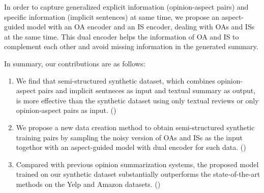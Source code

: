 In order to capture generalized explicit information (opinion-aspect pairs) and specific information  (implicit sentences) at same time,
we propose an aspect-guided model with an OA encoder and
an IS encoder, dealing with OAs and ISs at the same time.
This dual encoder helps
the information of OA and IS to complement each other 
and avoid missing information in the generated summary.

In summary, our contributions are as follows:
\begin{enumerate}
\item We find that semi-structured synthetic dataset,
which combines opinion-aspect pairs and implicit sentneces as input 
and textual summary as output, 
is more effective than the synthetic dataset using only textual reviews or only opinion-aspect pairs as input.
()

\item 
We propose a new data creation method to obtain
semi-structured synthetic training pairs by sampling the noisy version of 
OAs and ISs as the input togethor with an aspect-guided model with dual encoder for such data.
()


\item 
Compared with previous opinion summarization systems, 
the proposed model trained on our synthetic dataset substantially outperforms the 
state-of-the-art methods on the Yelp and Amazon datasets. ()
\end{enumerate}

